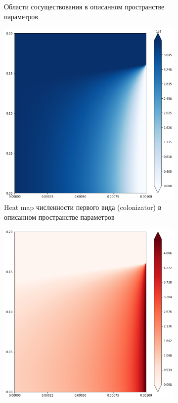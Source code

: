 \begin{figure}
\begin{subfigure}{.5\textwidth}
		\caption{Области сосуществования в описанном пространстве параметров} 
		\label{fig:cctod1:sub2}
	\end{subfigure}
	\begin{subfigure}{.5\textwidth}
		\centering
		\includegraphics[width=.95\linewidth]{ccto_d1_n1.png}
		\caption{Heat map численности первого вида (colonizator) в описанном пространстве параметров}
		\label{fig:cctod1:sub3}
	\end{subfigure}%
	\begin{subfigure}{.5\textwidth}
		\centering
		\includegraphics[width=.95\linewidth]{ccto_d1_n2.png}

\end{subfigure}
\end{figure}

